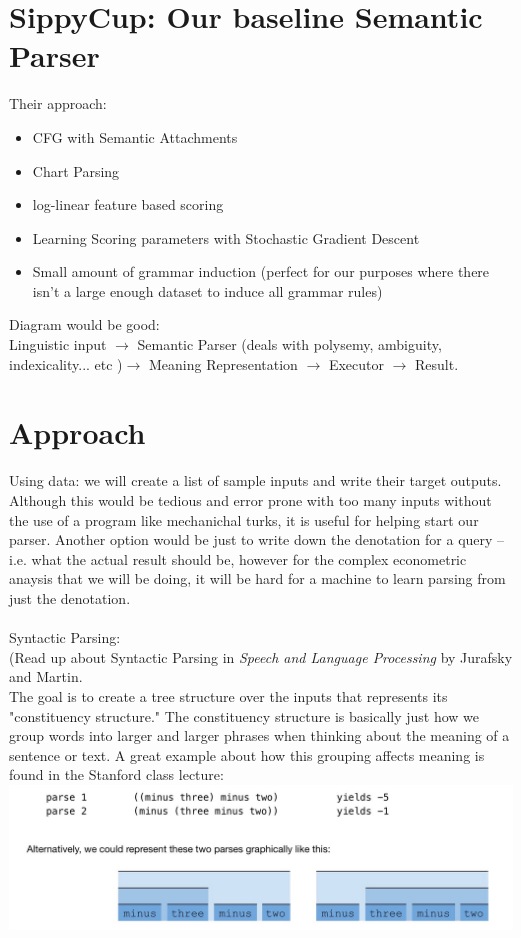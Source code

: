 \documentclass[pageno]{jpaper}
\begin{document}
\section{SippyCup: Our baseline Semantic Parser}
Their approach:
\begin{itemize}
\item CFG with Semantic Attachments
\item Chart Parsing
\item log-linear feature based scoring
\item Learning Scoring parameters with Stochastic Gradient Descent
\item Small amount of grammar induction (perfect for our purposes where there isn't a large enough dataset to induce all grammar rules)
\end{itemize}
Diagram would be good:
\\ Linguistic input $\to$ Semantic Parser (deals with polysemy, ambiguity, indexicality... etc )$\to$ Meaning Representation $\to$ Executor $\to$ Result.

\section{Approach}
Using data: we will create a list of sample inputs and write their target outputs. Although this would be tedious and error prone with too many inputs without the use of a program like mechanichal turks, it is useful for helping start our parser. Another option would be just to write down the denotation for a query -- i.e. what the actual result should be, however for the complex econometric anaysis that we will be doing, it will be hard for a machine to learn parsing from just the denotation.\\ \\

Syntactic Parsing: \\
(Read up about Syntactic Parsing in \textit{Speech and Language Processing} by Jurafsky and Martin.\\
The goal is to create a tree structure over the inputs that represents its "constituency structure." The constituency structure is basically just how we group words into larger and larger phrases when thinking about the meaning of a sentence or text.  A great example about how this grouping affects meaning is found in the Stanford class lecture: \\

\includegraphics[scale=.2]{imgs/synt_amb.jpeg}
\end{document}
